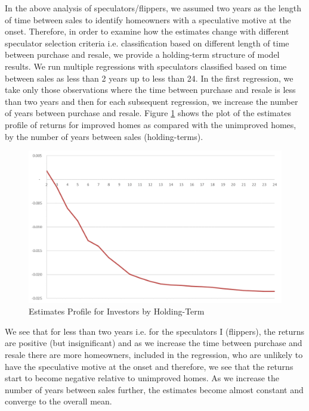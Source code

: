 \documentclass[AEJ,reqno, draftmode]{AEA} %
\begin{document}
In the above analysis of speculators/flippers, we assumed two years as the length of time between sales to identify homeowners with a speculative motive at the onset. Therefore, in order to examine how the estimates change with different speculator selection criteria i.e. classification based on different length of time between purchase and resale, we provide a holding-term structure of model results. We run multiple regressions with speculators classified based on time between sales as less than 2 years up to less than 24. In the first regression, we take only those observations where the time between purchase and resale is less than two years and then for each subsequent regression, we increase the number of years between purchase and resale. Figure \ref{fig:relative_returns_by_investor} shows the plot of the estimates profile of returns for improved homes as compared with the unimproved homes, by the number of years between sales (holding-terms).

\begin{figure}[!ht]
    \centering
     \includegraphics[width=\columnwidth]{Figures/regression_24_after_ACT_NT.png} \par
 \caption{Estimates Profile for Investors by Holding-Term}
 \vspace{-20pt}
 \label{fig:relative_returns_by_investor}
\end{figure} 



We see that for less than two years i.e. for the speculators I (flippers), the returns are positive (but insignificant) and as we increase the time between purchase and resale there are more homeowners, included in the regression, who are unlikely to have the speculative motive at the onset and therefore, we see that the returns start to become negative relative to unimproved homes. As we increase the number of years between sales further, the estimates become almost constant and converge to the overall mean. 
\end{document}
